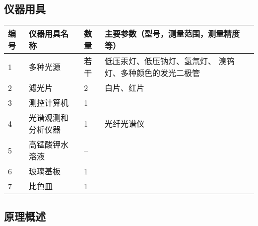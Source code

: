\documentclass[dvipsnames, svgnames,a4paper,11pt]{article}
\begin{document}
	\subsection{仪器用具}
		\begin{table}[htbp]
			\centering
			\renewcommand\arraystretch{1.6}
			\begin{tabular}{p{}|p{}|p{}|p{}}
			\hline
			编号& 仪器用具名称 & 数量 &  主要参数（型号，测量范围，测量精度等） \\
			\hline
			1 & 多种光源 	& 若干	& {\footnotesize 低压汞灯、低压钠灯、氢氘灯、 溴钨灯、多种颜色的发光二极管} \\
		
			2 & 滤光片 	& 2 	& 白片、红片 \\
			
			3 & 测控计算机 & 1 &  \\
			
			4 & 光谱观测和分析仪器 & 1 & 光纤光谱仪\\
			
			5 & 高锰酸钾水溶液 & -- &  \\
			
			6 & 玻璃基板 & 1  &  \\
			
			7 & 比色皿 & 1 & \\
			
			\hline
			\end{tabular}
		\end{table}
	
	\subsection{原理概述}
	
\end{document}
